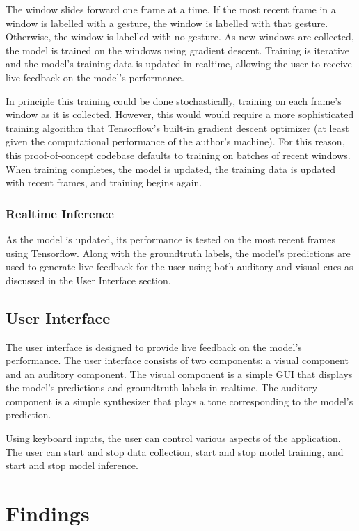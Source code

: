 \documentclass{article}
\begin{document}
The window slides forward one frame at a time. If the most recent frame in a window is labelled with a gesture, the window is labelled with that gesture. Otherwise, the window is labelled with no gesture. As new windows are collected, the model is trained on the windows using gradient descent. Training is iterative and the model's training data is updated in realtime, allowing the user to receive live feedback on the model's performance.

In principle this training could be done stochastically, training on each frame's window as it is collected. However, this would  would require a more sophisticated training algorithm that Tensorflow's built-in gradient descent optimizer (at least given the computational performance of the author's machine). For this reason, this proof-of-concept codebase defaults to training on batches of recent windows. When training completes, the model is updated, the training data is updated with recent frames, and training begins again.

\subsubsection{Realtime Inference}
As the model is updated, its performance is tested on the most recent frames using Tensorflow. Along with the groundtruth labels, the model's predictions are used to generate live feedback for the user using both auditory and visual cues as discussed in the User Interface section.

\subsection{User Interface}
The user interface is designed to provide live feedback on the model's performance. The user interface consists of two components: a visual component and an auditory component. The visual component is a simple GUI that displays the model's predictions and groundtruth labels in realtime. The auditory component is a simple synthesizer that plays a tone corresponding to the model's prediction. 

Using keyboard inputs, the user can control various aspects of the application. The user can start and stop data collection, start and stop model training, and start and stop model inference.


\section{Findings}



\end{document}
